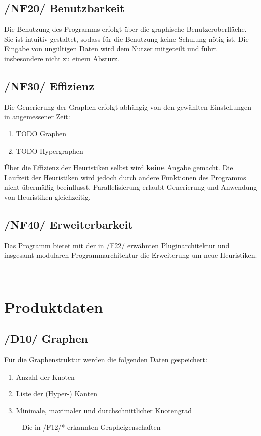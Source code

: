 \documentclass{article}
\begin{document}
	\subsection*{/NF20/ Benutzbarkeit} \label{nf20} 
	Die Benutzung des Programms erfolgt über die graphische Benutzeroberfläche. Sie ist intuitiv gestaltet, sodass für die Benutzung keine Schulung nötig ist. Die Eingabe von ungültigen Daten wird dem Nutzer mitgeteilt und führt insbesondere nicht zu einem Absturz.
	
	\subsection*{/NF30/ Effizienz} \label{nf30} 
	Die Generierung der Graphen erfolgt abhängig von den gewählten Einstellungen in angemessener Zeit:
	\begin{enumerate}[--]
		\item{TODO Graphen}
		\item{TODO Hypergraphen}
	\end{enumerate}
	Über die Effizienz der Heuristiken selbst wird \textbf{keine} Angabe gemacht. Die Laufzeit der Heuristiken wird jedoch durch andere Funktionen des Programms nicht übermäßig beeinflusst. Parallelisierung erlaubt Generierung und Anwendung von Heuristiken gleichzeitig.
	
	\subsection*{/NF40/ Erweiterbarkeit} \label{nf40} 
	Das Programm bietet mit der in /F22/ erwähnten Pluginarchitektur und insgesamt modularen Programmarchitektur die Erweiterung um neue Heuristiken.
	
	~\newpage
	\section{Produktdaten}
	\subsection*{/D10/ Graphen} \label{d10} 
	Für die Graphenstruktur werden die folgenden Daten gespeichert:
	\begin{enumerate}[--]
		\item{Anzahl der Knoten}
		\item{Liste der (Hyper-) Kanten}
		\item{Minimale, maximaler und durchschnittlicher Knotengrad}
		\item[--]{Die in /F12/* erkannten Grapheigenschaften}
	\end{enumerate}
	
\end{document}
